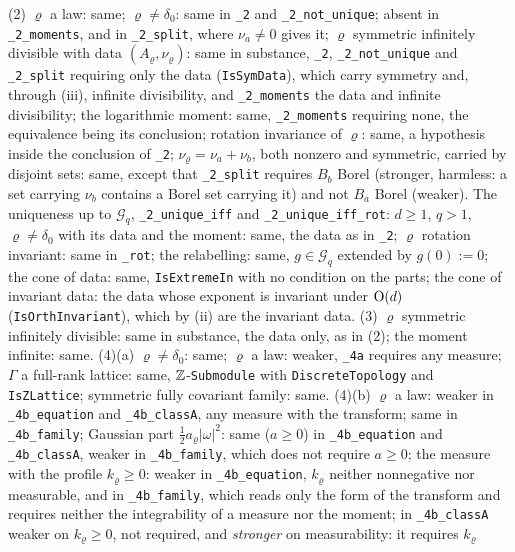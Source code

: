 \begin{proposition}
{(2) $\varrho$ a law: same; $\varrho \ne \delta_0$: same in \texttt{\_2} and
\texttt{\_2\_not\_unique}; absent in \texttt{\_2\_moments}, and in \texttt{\_2\_split}, where
$\nu_a \ne 0$ gives it; $\varrho$ symmetric infinitely divisible with data
$(A_\varrho, \nu_\varrho)$: same in substance, \texttt{\_2}, \texttt{\_2\_not\_unique} and
\texttt{\_2\_split} requiring only the data (\texttt{IsSymData}), which carry symmetry and, through
(iii), infinite divisibility, and \texttt{\_2\_moments} the data and infinite
divisibility; the logarithmic moment: same, \texttt{\_2\_moments} requiring none, the equivalence
being its conclusion; rotation invariance of $\varrho$: same, a hypothesis inside the conclusion of
\texttt{\_2}; $\nu_\varrho = \nu_a + \nu_b$, both nonzero and symmetric, carried by disjoint sets:
same, except that \texttt{\_2\_split} requires $B_b$ Borel (stronger, harmless: a set carrying $\nu_b$
contains a Borel set carrying it) and not $B_a$ Borel (weaker). The uniqueness up to
$\mathcal{G}_q$, \texttt{\_2\_unique\_iff} and \texttt{\_2\_unique\_iff\_rot}: $d \ge 1$, $q > 1$,
$\varrho \ne \delta_0$ with its data and the moment: same, the data as in \texttt{\_2}; $\varrho$
rotation invariant: same in \texttt{\_rot}; the relabelling: same, $g \in \mathcal{G}_q$ extended by
$g(0) := 0$; the cone of data: same, \texttt{IsExtremeIn} with no condition on the parts; the cone
of invariant data: the data whose exponent is invariant under $\mathrm{O}(d)$
(\texttt{IsOrthInvariant}), which by (ii) are the invariant data. (3) $\varrho$ symmetric
infinitely divisible: same in substance, the data only, as in (2); the moment infinite: same.
(4)(a) $\varrho \ne \delta_0$: same; $\varrho$ a law: weaker, \texttt{\_4a} requires any measure;
$\Gamma$ a full-rank lattice: same, $\mathbb{Z}$-\texttt{Submodule} with \texttt{DiscreteTopology} and
\texttt{IsZLattice}; symmetric fully covariant family: same. (4)(b) $\varrho$ a law: weaker in
\texttt{\_4b\_equation} and \texttt{\_4b\_classA}, any measure with the transform; same in
\texttt{\_4b\_family}; Gaussian part $\tfrac12a_\varrho|\omega|^2$: same ($a \ge 0$) in
\texttt{\_4b\_equation} and \texttt{\_4b\_classA}, weaker in \texttt{\_4b\_family}, which does not
require $a \ge 0$; the \Levy{} measure with the profile $k_\varrho \ge 0$: weaker in
\texttt{\_4b\_equation}, $k_\varrho$ neither nonnegative nor measurable, and in
\texttt{\_4b\_family}, which reads only the form of the transform and requires neither the
integrability of a \Levy{} measure nor the moment; in \texttt{\_4b\_classA} weaker on
$k_\varrho \ge 0$, not required, and \emph{stronger} on measurability: it requires $k_\varrho$
}
\end{proposition}
